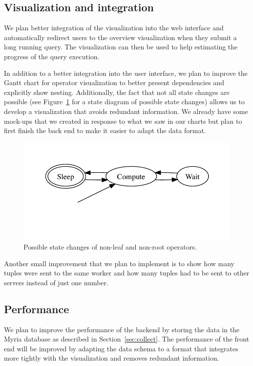 \documentclass[11pt]{scrartcl}
\begin{document}
\subsection{Visualization and integration}
\label{sec:vizimprovement}

We plan better integration of the visualization into the web interface and automatically redirect users to the overview visualization when they submit a long running query. The visualization can then be used to help estimating the progress of the query execution.

In addition to a better integration into the user interface, we plan to improve the Gantt chart for operator visualization to better present dependencies and explicitly show nesting. Additionally, the fact that not all state changes are possible (see Figure~\ref{fig:states} for a state diagram of possible state changes) allows us to develop a visualization that avoids redundant information. We already have some mock-ups that we created in response to what we saw in our charts but plan to first finish the back end to make it easier to adapt the data format.

\begin{figure}[h]
  \begin{center}
    \includegraphics[width=.5\textwidth]{states.pdf}
  \end{center}
  \caption{Possible state changes of non-leaf and non-root operators.}
  \label{fig:states}
\end{figure}

Another small improvement that we plan to implement is to show how many tuples were sent to the same worker and how many tuples had to be sent to other servers instead of just one number.


\subsection{Performance}
\label{sec:performance}

We plan to improve the performance of the backend by storing the data in the Myria database as described in Section~\ref{sec:collect}. The performance of the front end will be improved by adapting the data schema to a format that integrates more tightly with the visualization and removes redundant information.
\end{document}
